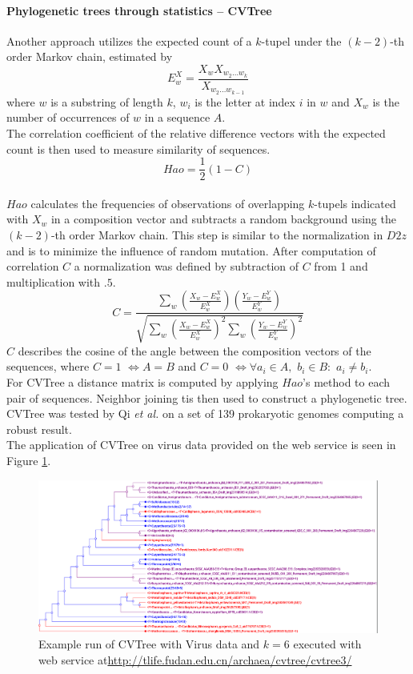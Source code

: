 \documentclass[twocolumn]{bmcart}%
\begin{document}
\paragraph*{Phylogenetic trees through statistics -- CVTree}
Another approach utilizes the expected count of a $k$-tupel under the $(k-2)$-th order Markov chain, estimated by 
$$E_w^X=\frac{X_wX_{w_2\dots w_k}}{X_{w_2\dots w_{k-1}}}$$
where $w$ is a substring of length $k$, $w_i$ is the letter at index $i$ in $w$ and $X_w$ is the number of occurrences of $w$ in a sequence $A$.\\
The correlation coefficient of the relative difference vectors with the expected count is then used to measure similarity of sequences\cite{doi:10.1093/bib/bbt067}.
$$Hao=\frac{1}{2}\left(1-C\right)$$
\\
$Hao$ calculates the frequencies of observations of overlapping $k$-tupels indicated with $X_w$ in a composition vector and subtracts a random background using the $(k-2)$-th order Markov chain. This step is similar to the normalization in $D2z$ and is to minimize the influence of random mutation. After computation of correlation $C$ a normalization was defined by subtraction of $C$ from 1 and multiplication with $.5$.
$$C=\frac{\sum_w\left(\frac{X_w-E_w^X}{E_w^X}\right)\left(\frac{Y_w-E_w^Y}{E_w^Y}\right)}{\sqrt{\sum_w\left(\frac{X_w-E_w^X}{E_w^X}\right)^2\sum_w\left(\frac{Y_w-E_w^Y}{E_w^Y}\right)^2}}$$
$C$ describes the cosine of the angle between the composition vectors of the sequences, where $C=1$ $\Leftrightarrow A=B$ and $C=0$ $\Leftrightarrow \forall a_i \in A,$ $b_i \in B:$ $a_i \neq b_i$. \\
For CVTree a distance matrix is computed by applying $Hao$'s method to each pair of sequences. Neighbor joining tis then used to construct a phylogenetic tree.\\
CVTree was tested by Qi \textit{et al.} on a set of 139 prokaryotic genomes computing a robust result\cite{qi2004cvtree}. \\
The application of CVTree on virus data provided on the web service is seen in Figure \ref{img:cvtree}.
\begin{figure}
	\centering
	\includegraphics[width=.99\textwidth]{bilder/CVTree.png}
	\caption{Example run of CVTree with Virus data and $k=6$ executed with web service at\newline \url{http://tlife.fudan.edu.cn/archaea/cvtree/cvtree3/} \cite{qi2004whole,zuo2015cvtree3}}
	\label{img:cvtree}
\end{figure}%
\end{document}
